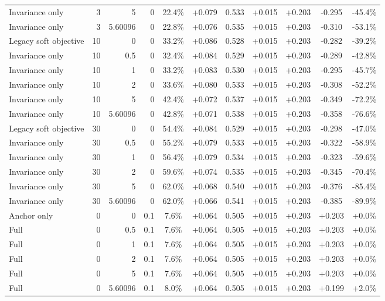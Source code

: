 \begin{table}[htbp]
\begin{tabular}{lrrrccccccc}
Invariance only & 3 & 5 & 0 & 22.4\% & +0.079 & 0.533 & +0.015 & +0.203 & -0.295 & -45.4\% \\
Invariance only & 3 & 5.60096 & 0 & 22.8\% & +0.076 & 0.535 & +0.015 & +0.203 & -0.310 & -53.1\% \\
Legacy soft objective & 10 & 0 & 0 & 33.2\% & +0.086 & 0.528 & +0.015 & +0.203 & -0.282 & -39.2\% \\
Invariance only & 10 & 0.5 & 0 & 32.4\% & +0.084 & 0.529 & +0.015 & +0.203 & -0.289 & -42.8\% \\
Invariance only & 10 & 1 & 0 & 33.2\% & +0.083 & 0.530 & +0.015 & +0.203 & -0.295 & -45.7\% \\
Invariance only & 10 & 2 & 0 & 33.6\% & +0.080 & 0.533 & +0.015 & +0.203 & -0.308 & -52.2\% \\
Invariance only & 10 & 5 & 0 & 42.4\% & +0.072 & 0.537 & +0.015 & +0.203 & -0.349 & -72.2\% \\
Invariance only & 10 & 5.60096 & 0 & 42.8\% & +0.071 & 0.538 & +0.015 & +0.203 & -0.358 & -76.6\% \\
Legacy soft objective & 30 & 0 & 0 & 54.4\% & +0.084 & 0.529 & +0.015 & +0.203 & -0.298 & -47.0\% \\
Invariance only & 30 & 0.5 & 0 & 55.2\% & +0.079 & 0.533 & +0.015 & +0.203 & -0.322 & -58.9\% \\
Invariance only & 30 & 1 & 0 & 56.4\% & +0.079 & 0.534 & +0.015 & +0.203 & -0.323 & -59.6\% \\
Invariance only & 30 & 2 & 0 & 59.6\% & +0.074 & 0.535 & +0.015 & +0.203 & -0.345 & -70.4\% \\
Invariance only & 30 & 5 & 0 & 62.0\% & +0.068 & 0.540 & +0.015 & +0.203 & -0.376 & -85.4\% \\
Invariance only & 30 & 5.60096 & 0 & 62.0\% & +0.066 & 0.541 & +0.015 & +0.203 & -0.385 & -89.9\% \\
Anchor only & 0 & 0 & 0.1 & 7.6\% & +0.064 & 0.505 & +0.015 & +0.203 & +0.203 & +0.0\% \\
Full & 0 & 0.5 & 0.1 & 7.6\% & +0.064 & 0.505 & +0.015 & +0.203 & +0.203 & +0.0\% \\
Full & 0 & 1 & 0.1 & 7.6\% & +0.064 & 0.505 & +0.015 & +0.203 & +0.203 & +0.0\% \\
Full & 0 & 2 & 0.1 & 7.6\% & +0.064 & 0.505 & +0.015 & +0.203 & +0.203 & +0.0\% \\
Full & 0 & 5 & 0.1 & 7.6\% & +0.064 & 0.505 & +0.015 & +0.203 & +0.203 & +0.0\% \\
Full & 0 & 5.60096 & 0.1 & 8.0\% & +0.064 & 0.505 & +0.015 & +0.203 & +0.199 & +2.0\% \\

\end{tabular}
\end{table}
